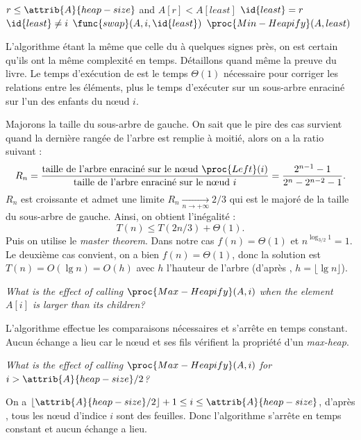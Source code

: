 \begin{description}
\begin{ex}
\begin{codebox}
        \li \If $r \le \attrib{A}{heap-size}$ and $A[r] < A[least]$ \Do
        \li $\id{least} = r$  \End    
        \li \If $\id{least} \ne i$ \Do
        \li $\func{swap}(A,i,\id{least})$
        \li $\proc{Min-Heapify}(A,least)$
      \end{codebox}
      L'algorithme \'etant la m\^eme que celle du  \`a quelques signes pr\`es, on est certain qu'ils ont la m\^eme complexit\'e en temps. D\'etaillons quand m\^eme la preuve du livre. 
      Le temps d'ex\'ecution de  est le temps $\Theta(1)$ n\'ecessaire pour corriger les relations entre les \'el\'ements, plus le temps d'ex\'ecuter  sur un sous-arbre enracin\'e sur l'un des enfants du n\oe ud $i$. 
      
      Majorons la taille du sous-arbre de gauche.  On sait que le pire des cas survient quand la derni\`ere rang\'ee de l'arbre est remplie \`a moiti\'e, alors on a la ratio suivant : 
      \[R_n = \frac{\textrm{taille de l'arbre enracin\'e sur le n\oe ud  } \proc{Left}(i)}{\textrm{taille de l'arbre enracin\'e sur le n\oe ud } i} = \frac{2^{n-1}-1}{2^n-2^{n-2}-1}.\]
      $R_n$ est croissante et admet une limite $R_n \underset{n \to +\infty}{\longrightarrow} 2/3$ qui est le major\'e de la taille du sous-arbre de gauche. Ainsi, on obtient l'in\'egalit\'e : \[T(n) \le T(2n/3) + \Theta(1).\]
      Puis on utilise le \textit{master theorem}. Dans notre cas $f(n) = \Theta(1)$ et $n^{\log_{3/2}1} = 1$. Le deuxi\`eme cas convient, on a bien $f(n) = \Theta(1)$, donc la solution est $T(n) = O(\lg n) = O(h)$ avec $h$ l'hauteur de l'arbre (d'apr\`es , $h = \lfloor \lg n \rfloor$). 
    \end{ex}
   \textit{What is the effect of calling $\proc{Max-Heapify}(A,i)$ when the element $A[i]$ is larger than its children?}
    \begin{ex}
      L'algorithme effectue les comparaisons n\'ecessaires et s'arr\^ete en temps constant. Aucun \'echange a lieu car le n\oe ud et ses fils v\'erifient la propri\'et\'e d'un \textit{max-heap}.
    \end{ex}
   \textit{What is the effect of calling $\proc{Max-Heapify}(A,i)$ for $i > \attrib{A}{heap-size}/2$?}
    \begin{ex}
      On a $\lfloor \attrib{A}{heap-size}/2 \rfloor + 1 \le i \le \attrib{A}{heap-size}$, d'apr\`es , tous les n\oe ud d'indice $i$ sont des feuilles. Donc l'algorithme s'arr\^ete en temps constant et aucun \'echange a lieu.

\end{ex}
\end{description}
